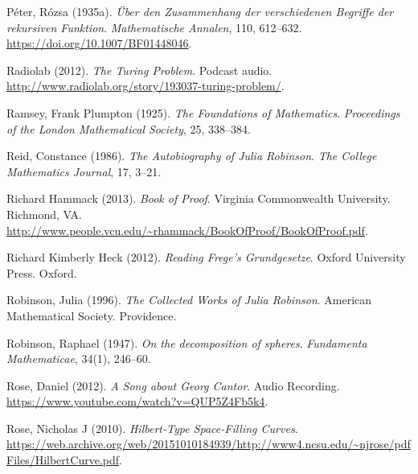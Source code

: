 \par\medskip{}\label{bib:Peter1935a}
P{\'e}ter, R{\'o}zsa (1935a). \emph{{\"U}ber den {Z}usammenhang der verschiedenen {B}egriffe der rekursiven {F}unktion}. \emph{Mathematische Annalen}, 110, 612--632. \url{https://doi.org/10.1007/BF01448046}.

\par\medskip{}\label{bib:Radiolab2012}
Radiolab (2012). \emph{The {T}uring Problem}. Podcast audio. \url{http://www.radiolab.org/story/193037-turing-problem/}.

\par\medskip{}\label{bib:Ramsey1925}
Ramsey, Frank Plumpton (1925). \emph{The Foundations of Mathematics}. \emph{Proceedings of the London Mathematical Society}, 25, 338--384.

\par\medskip{}\label{bib:Reid1986}
Reid, Constance (1986). \emph{The Autobiography of {J}ulia {R}obinson}. \emph{The College Mathematics Journal}, 17, 3--21.

\par\medskip{}\label{bib:Hammack2013}
Richard Hammack (2013). \emph{Book of Proof}. Virginia Commonwealth University. Richmond, VA. \url{http://www.people.vcu.edu/~rhammack/BookOfProof/BookOfProof.pdf}.

\par\medskip{}\label{bib:Heck2012}
Richard Kimberly Heck (2012). \emph{Reading Frege's Grundgesetze}. Oxford University Press. Oxford.

\par\medskip{}\label{bib:Robinson1996}
Robinson, Julia (1996). \emph{The Collected Works of Julia Robinson}. American Mathematical Society. Providence.

\par\medskip{}\label{bib:Robinson1947}
Robinson, Raphael (1947). \emph{On the decomposition of spheres}. \emph{Fundamenta Mathematicae}, 34(1), 246--60.

\par\medskip{}\label{bib:Rose2012}
Rose, Daniel (2012). \emph{A Song about {G}eorg {C}antor}. Audio Recording. \url{https://www.youtube.com/watch?v=QUP5Z4Fb5k4}.

\par\medskip{}\label{bib:Rose2010}
Rose, Nicholas J (2010). \emph{Hilbert-Type Space-Filling Curves}. \url{https://web.archive.org/web/20151010184939/http://www4.ncsu.edu/~njrose/pdfFiles/HilbertCurve.pdf}.

